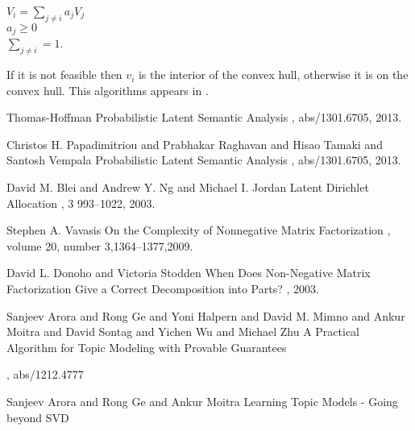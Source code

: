 \documentclass[11pt]{article}
\begin{document}
$V_i = \sum_{j \neq i} a_jV_j$ \\
$a_j \geq 0$\\
$\sum_{j \neq i} = 1$.

If it is not feasible then $v_i$ is the interior of the convex hull, otherwise it is on the convex hull. This algorithms appears in \cite{ProvMax}. 






\begin{thebibliography}{42}

Thomas-Hoffman
\newblock Probabilistic Latent Semantic Analysis
, abs/1301.6705, 2013.


Christos H. Papadimitriou and
               Prabhakar Raghavan and
               Hisao Tamaki and
               Santosh Vempala
\newblock Probabilistic Latent Semantic Analysis
, abs/1301.6705, 2013.


David M. Blei and
               Andrew Y. Ng and
               Michael I. Jordan
\newblock Latent Dirichlet Allocation
, {3} 993--1022, 2003.


Stephen A. Vavasis
\newblock On the Complexity of Nonnegative Matrix Factorization
, volume 20, number 3,1364--1377,2009. 



David L. Donoho and
               Victoria Stodden
\newblock When Does Non-Negative Matrix Factorization Give a Correct Decomposition
               into Parts?
, 2003.



Sanjeev Arora and
               Rong Ge and
               Yoni Halpern and
               David M. Mimno and
               Ankur Moitra and
               David Sontag and
               Yichen Wu and
               Michael Zhu
\newblock A Practical Algorithm for Topic Modeling with Provable Guarantees

, abs/1212.4777




Sanjeev Arora and
               Rong Ge and
               Ankur Moitra
\newblock Learning Topic Models - Going beyond {SVD}


\end{thebibliography}
\end{document}
